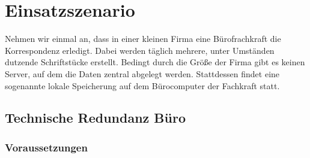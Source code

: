 

\section{Einsatzszenario}

Nehmen wir einmal an, dass in einer kleinen Firma eine Bürofrachkraft die
Korrespondenz erledigt. Dabei werden täglich mehrere, unter Umständen dutzende
Schriftstücke erstellt. Bedingt durch die Größe der Firma gibt es keinen
Server, auf dem die Daten zentral abgelegt werden. Stattdessen findet eine
sogenannte lokale Speicherung auf dem Bürocomputer der Fachkraft statt.

\subsection{Technische Redundanz Büro}

\subsubsection{Voraussetzungen}

